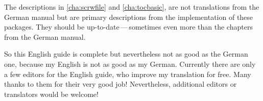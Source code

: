 The descriptions in \autoref{cha:scrwfile} and \autoref{cha:tocbasic}, are not
translations from the German manual but are primary descriptions from the
implementation of these packages. They should be up-to-date\,---\,sometimes
even more than the chapters from the German manual.

So this English guide is complete but nevertheless not as good as the German
one, because my English is not as good as my German. Currently there are only
a few editors for the English guide, who improve my translation for free. Many
thanks to them for their very good job! Nevertheless, additional editors or
translators would be welcome!

\endinput


